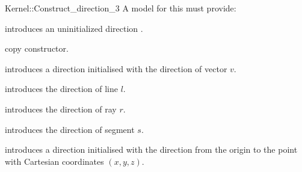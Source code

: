 \begin{ccRefFunctionObjectConcept}{Kernel::Construct_direction_3}
A model for this must provide:



\ccHidden {}
             {introduces an uninitialized direction .}

\ccHidden {}
            {copy constructor.}

            {introduces a direction  initialised with the 
             direction of vector $v$.}

            {introduces the direction of line $l$.}

            {introduces the direction of ray $r$.}

            {introduces the direction of segment $s$.}

\ccHidden{}
            {introduces a direction  initialised with the direction 
             from the origin to the point with Cartesian coordinates $(x, y, z)$.}


\end{ccRefFunctionObjectConcept}
